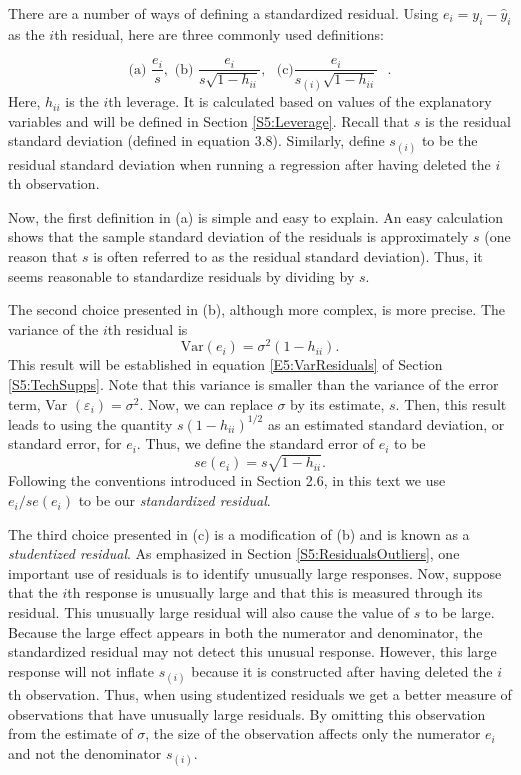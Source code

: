 There are a number of ways of defining a standardized residual.
Using $e_i = y_i-\hat{y}_i$ as the $i$th residual, here are three
commonly used definitions:

\begin{equation} \label{E5:StdResid}
\text{(a) }\frac{e_i}{s},\text{ \ \ \ (b) }\frac{e_i}{s\sqrt{
1-h_{ii}}}, \text { \  \   \   }\text{(c)
}\frac{e_i}{s_{(i)}\sqrt{1-h_{ii}}}\text{\ }.
\end{equation}
 \noindent Here, $h_{ii}$ is the $i$th leverage. It
is calculated based on values of the explanatory variables and will
be defined in Section \ref{S5:Leverage}. Recall that $s$ is the
residual standard deviation (defined in equation 3.8). Similarly,
define $s_{(i)}$ to be the residual standard deviation when running
a regression after having deleted the $i$th observation.

Now, the first definition in (a) is simple and easy to explain. An
easy calculation shows that the sample standard deviation of the
residuals is approximately $s$ (one reason that $s$ is often
referred to as the residual standard deviation). Thus, it seems
reasonable to standardize residuals by dividing by $s$.

The second choice presented in (b), although more complex, is more
precise. The variance of the $i$th residual is
\begin{equation*}
\mathrm{Var}(e_i)=\sigma ^2(1-h_{ii}).
\end{equation*}
This result will be established in equation \ref{E5:VarResiduals} of
Section \ref{S5:TechSupps}. Note that this variance is smaller than
the variance of the error term, Var $(\varepsilon_i)=\sigma ^2$.
Now, we can replace $\sigma $ by its estimate, $s$. Then, this
result leads to using the quantity $s(1-h_{ii})^{1/2}$ as an
estimated standard deviation, or standard error, for $e_i$. Thus, we
define the standard error of $e_i$ to be
\begin{equation*}
se(e_i)=s \sqrt{1-h_{ii}}.
\end{equation*}
Following the conventions introduced in Section 2.6, in this text we
use $e_i/se(e_i)$ to be our \textit{standardized residual}.


The third choice presented in (c) is a modification of (b) and is
known as a \textit{studentized residual}. As emphasized in Section
\ref{S5:ResidualsOutliers}, one important use of residuals is to
identify unusually large responses. Now, suppose that the $i$th
response is unusually large and that this is measured through its
residual. This unusually large residual will also cause the value of
$s$ to be large. Because the large effect appears in both the
numerator and denominator, the standardized residual may not detect
this unusual response. However, this large response will not inflate
$s_{(i)}$ because it is constructed after having deleted the $i$th
observation. Thus, when using studentized residuals we get a better
measure of observations that have unusually large residuals. By
omitting this observation from the estimate of $\sigma $, the size
of the observation affects only the numerator $e_i$ and not the
denominator $s_{(i)}$.

